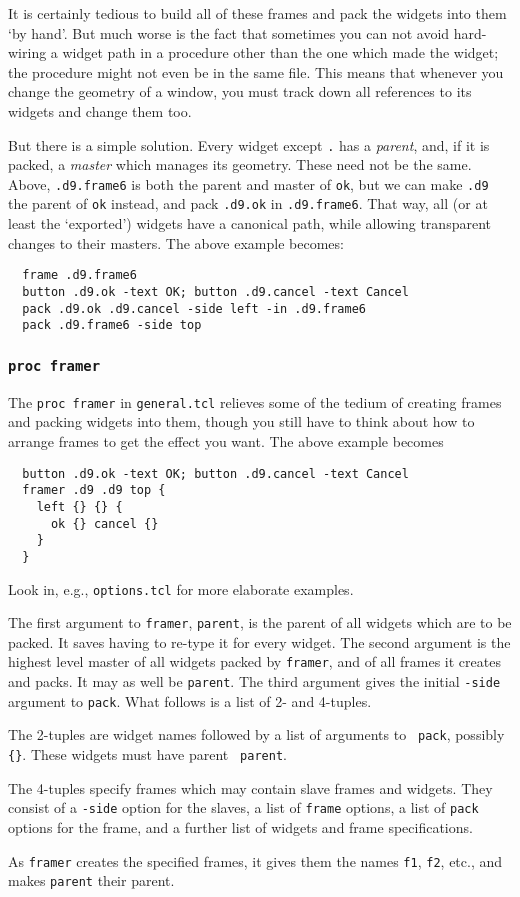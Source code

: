 It is certainly tedious to build all of these frames and pack the
widgets into them `by hand'. But much worse is the fact that sometimes
you can not avoid hard-wiring a widget path in a procedure other than
the one which made the widget; the procedure might not even be in the
same file.  This means that whenever you change the geometry of a
window, you must track down all references to its widgets and change
them too.

But there is a simple solution. Every widget except {\tt .} has a {\em
parent}, and, if it is packed, a {\em master} which manages its
geometry. These need not be the same. Above, {\tt .d9.frame6} is both
the parent and master of {\tt ok}, but we can make {\tt .d9} the
parent of {\tt ok} instead, and pack {\tt .d9.ok} in {\tt .d9.frame6}.
That way, all (or at least the `exported') widgets have a canonical
path, while allowing transparent changes to their masters. The above
example becomes:

\begin{verbatim}
  frame .d9.frame6
  button .d9.ok -text OK; button .d9.cancel -text Cancel
  pack .d9.ok .d9.cancel -side left -in .d9.frame6
  pack .d9.frame6 -side top
\end{verbatim}


\subsubsection{{\tt proc framer}}

The {\tt proc framer} in {\tt general.tcl} relieves some of the tedium
of creating frames and packing widgets into them, though you still
have to think about how to arrange frames to get the effect you want.
The above example becomes

\begin{verbatim}
  button .d9.ok -text OK; button .d9.cancel -text Cancel
  framer .d9 .d9 top {
    left {} {} {
      ok {} cancel {}
    }
  }
\end{verbatim}

Look in, e.g., {\tt options.tcl} for more elaborate examples.

The first argument to {\tt framer}, {\tt parent}, is the parent of all
widgets which are to be packed. It saves having to re-type it for
every widget. The second argument is the highest level master of all
widgets packed by {\tt framer}, and of all frames it creates and
packs. It may as well be {\tt parent}. The third argument gives the
initial {\tt -side} argument to {\tt pack}.  What follows is a list of
2- and 4-tuples.

The 2-tuples are widget names followed by a list of arguments to {\tt
pack}, possibly {\tt\{\}}. These widgets must have parent {\tt
parent}.

The 4-tuples specify frames which may contain slave frames and
widgets. They consist of a {\tt -side} option for the slaves, a list
of {\tt frame} options, a list of {\tt pack} options for the frame,
and a further list of widgets and frame specifications.

As {\tt framer} creates the specified frames, it gives them the names
{\tt f1}, {\tt f2}, etc., and makes {\tt parent} their parent.
